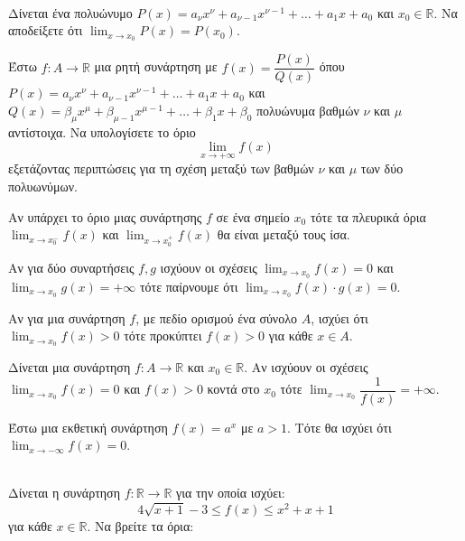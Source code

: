 \documentclass[twoside,nofonts,ektypwsh,math,spyros]{frontisthrio-diag}
\let\oldlim\lim
\renewcommand{\lim}{\displaystyle\oldlim}
\begin{document}
\begin{thema}
\item \mbox{}\\
\vspace{-7mm}
\begin{erwthma}
\item Δίνεται ένα πολυώνυμο $ P(x)=a_\nu x^\nu+a_{\nu-1}x^{\nu-1}+\ldots+a_1x+a_0 $ και $ x_0\in\mathbb{R} $. Να αποδείξετε ότι $ {\displaystyle{\lim_{x\to x_0}{P(x)}=P(x_0)}} $.
\item Έστω $ f:A\to\mathbb{R} $ μια ρητή συνάρτηση με $ f(x)=\dfrac{P(x)}{Q(x)} $ όπου $ P(x)=a_\nu x^\nu+a_{\nu-1}x^{\nu-1}+\ldots+a_1x+a_0 $ και $ Q(x)=\beta_\mu x^\mu+\beta_{\mu-1}x^{\mu-1}+\ldots+\beta_1x+\beta_0 $ πολυώνυμα βαθμών $ \nu $ και $ \mu $ αντίστοιχα. Να υπολογίσετε το όριο \[ \lim_{x\to +\infty}{f(x)} \] εξετάζοντας περιπτώσεις για τη σχέση μεταξύ των βαθμών $ \nu $ και $ \mu $ των δύο πολυωνύμων.
\item \swstolathospan
\begin{alist}
\item Αν υπάρχει το όριο μιας συνάρτησης $ f $ σε ένα σημείο $ x_0 $ τότε τα πλευρικά όρια $ \lim_{x\to x_0^-}{f(x)} $ και $ \lim_{x\to x_0^+}f(x) $ θα είναι μεταξύ τους ίσα.
\item Αν για δύο συναρτήσεις $ f,g $ ισχύουν οι σχέσεις $ \lim_{x\to x_0}{f(x)}=0 $ και $ \lim_{x\to x_0}{g(x)}=+\infty $ τότε παίρνουμε ότι $ \lim_{x\to x_0}{f(x)\cdot g(x)}=0 $.
\item Αν για μια συνάρτηση $ f $, με πεδίο ορισμού ένα σύνολο $ A $, ισχύει ότι $ \lim_{x\to x_0}{f(x)}>0 $ τότε προκύπτει $ f(x)>0 $ για κάθε $ x\in A $.
\item Δίνεται μια συνάρτηση $ f:A\to\mathbb{R} $ και $ x_0\in\mathbb{R} $. Αν ισχύουν οι σχέσεις $ \lim_{x\to x_0}{f(x)}=0 $ και $ f(x)>0 $ κοντά στο $ x_0 $ τότε $ \lim_{x\to x_0}{\dfrac{1}{f(x)}}=+\infty $.
\item Έστω μια εκθετική συνάρτηση $ f(x)=a^x $ με $ a>1 $. Τότε θα ισχύει ότι $ \lim_{x\to -\infty}{f(x)}=0 $.
\end{alist}
\end{erwthma}
\item \mbox{}\\
Δίνεται η συνάρτηση $ f:\mathbb{R}\to\mathbb{R} $ για την οποία ισχύει:
\[ 4\sqrt{x+1}-3\leq f(x)\leq x^2+x+1 \]
για κάθε $ x\in\mathbb{R} $. Να βρείτε τα όρια:

\end{thema}
\end{document}
